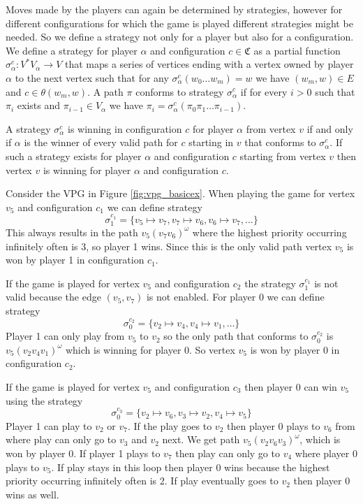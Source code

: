 Moves made by the players can again be determined by strategies, however for different configurations for which the game is played different strategies might be needed. So we define a strategy not only for a player but also for a configuration. We define a strategy for player $\alpha$ and configuration $c \in \mathfrak{C}$ as a partial function $\sigma_\alpha^c : V^*V_\alpha \rightarrow V$ that maps a series of vertices ending with a vertex owned by player $\alpha$ to the next vertex such that for any $\sigma_\alpha^c(w_0\dots w_m) = w$ we have $(w_m,w) \in E$ and $c \in \theta(w_m,w)$. A path $\pi$ conforms to strategy $\sigma_\alpha^c$ if for every $i > 0$ such that $\pi_i$ exists and $\pi_{i-1}\in V_\alpha$ we have $\pi_i = \sigma_\alpha^c(\pi_0\pi_1\dots\pi_{i-1})$.

A strategy $\sigma_\alpha^c$ is winning in configuration $c$ for player $\alpha$ from vertex $v$ if and only if $\alpha$ is the winner of every valid path for $c$ starting in $v$ that conforms to $\sigma_\alpha^c$. If such a strategy exists for player $\alpha$ and configuration $c$ starting from vertex $v$ then vertex $v$ is winning for player $\alpha$ and configuration $c$.

\begin{example}
	Consider the VPG in Figure \ref{fig:vpg_basicex}. When playing the game for vertex $v_5$ and configuration $c_1$ we can define strategy 
	\[ \sigma_1^{c_1} = \{ v_5 \mapsto v_7, v_7\mapsto v_6,v_6\mapsto v_7, \dots \}\]
	This always results in the path $v_5(v_7v_6)^\omega$ where the highest priority occurring infinitely often is 3, so player 1 wins. Since this is the only valid path vertex $v_5$ is won by player 1 in configuration $c_1$.
	
	If the game is played for vertex $v_5$ and configuration $c_2$ the strategy $\sigma_1^{c_1}$ is not valid because the edge $(v_5,v_7)$ is not enabled. For player $0$ we can define strategy
	\[ \sigma_0^{c_2} = \{ v_2 \mapsto v_4, v_4 \mapsto v_1,\dots\}\]
	Player 1 can only play from $v_5$ to $v_2$ so the only path that conforms to $\sigma_0^{c_2}$ is $v_5(v_2v_4v_1)^\omega$ which is winning for player 0. So vertex $v_5$ is won by player 0 in configuration $c_2$.
	
	If the game is played for vertex $v_5$ and configuration $c_3$ then player $0$ can win $v_5$ using the strategy
	\[ \sigma_0^{c_3} = \{ v_2 \mapsto v_6, v_3 \mapsto v_2, v_4 \mapsto v_5 \}\]
	Player 1 can play to $v_2$ or $v_7$. If the play goes to $v_2$ then player 0 plays to $v_6$ from where play can only go to $v_3$ and $v_2$ next. We get path $v_5(v_2v_6v_3)^\omega$, which is won by player 0. If player 1 plays to $v_7$ then play can only go to $v_4$ where player 0 plays to $v_5$. If play stays in this loop then player 0 wins because the highest priority occurring infinitely often is 2. If play eventually goes to $v_2$ then player 0 wins as well.
\end{example}


